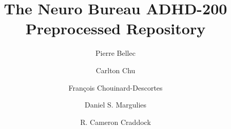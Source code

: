 \documentclass[preprint,12pt,3p]{elsarticle}
\begin{document}
\begin{frontmatter}

\title{The Neuro Bureau ADHD-200 Preprocessed Repository}




\author[label0,label1,label2]{Pierre Bellec}
\address[label0]{The Neuro Bureau}
\address[label1]{Centre de Recherche de l'Institut Universitaire de G\'eriatrie de Montr\'eal, Montr\'eal, CA}
\address[label2]{D\'epartement d'Informatique et de Recherche Op\'erationnelle, Universit\'e de Montr\'eal, Montr\'eal, CA}



\author[label0,label3]{Carlton Chu}
\address[label3]{Deep Mind, London, UK}

\author[label0,label1,label4]{Fran\c{c}ois Chouinard-Descortes}
\address[label4]{McGill University, Montreal, CA}

\author[label0,label5]{Daniel S. Margulies}
\address[label5]{Max Planck Research Group for Neuroanatomy \& Connectivity, Max Planck Institute for Human Cognitive and Brain Sciences, Leipzig, Germany}

\author[label0,lab6,lab7]{R. Cameron Craddock}
\address[lab6]{Computational Neuroimaging Laboratory, Center for Biomedical Imaging and Neuromodulation, Nathan S. Kline Institute for Psychiatric Research, Orangeburg, NY, USA}
\address[lab7]{Center for the Developing Brain, Child Mind Institute, New York, NY, USA}


\end{frontmatter}
\end{document}
